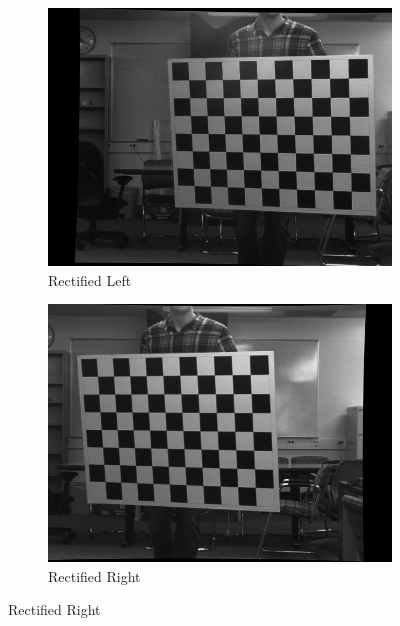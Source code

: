 \documentclass[12pt,a4paper,final]{article}
\begin{document}
\begin{figure}[H]
\centering
\begin{subfigure}{.5\textwidth}
  \centering
  \includegraphics[width=.9\linewidth]{RemapL}
  \caption{Rectified Left}
  \label{fig:sub1}
\end{subfigure}%
\begin{subfigure}{.5\textwidth}
  \centering
  \includegraphics[width=.9\linewidth]{RemapR}
  \caption{Rectified Right}
  \label{fig:sub2}
\end{subfigure}
\label{fig:test}
\end{figure}
\end{document}
